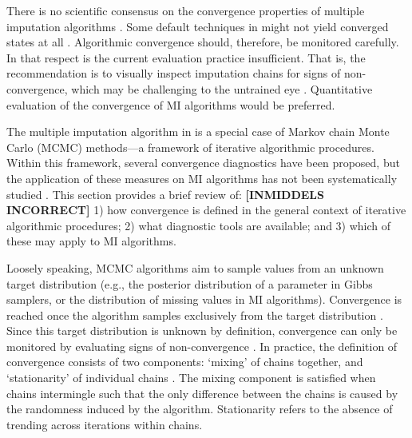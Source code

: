 \documentclass[article]{jss}
\begin{document}
There is no scientific consensus on the convergence properties of multiple imputation algorithms \citep{taka17}. Some default techniques in  might not yield converged states at all \citep{murr18}. Algorithmic convergence should, therefore, be monitored carefully. In that respect is the current evaluation practice insufficient. That is, the  recommendation is to visually inspect imputation chains for signs of non-convergence, which may be challenging to the untrained eye \citep[\S~6.5.2]{buur18}. Quantitative evaluation of the convergence of MI algorithms would be preferred.

The multiple imputation algorithm in  is a special case of Markov chain Monte Carlo (MCMC) methods---a framework of iterative algorithmic procedures. Within this framework, several convergence diagnostics have been proposed, but the application of these measures on MI algorithms has not been systematically studied \citep{buur18}.
This section provides a brief review of: \textbf{[INMIDDELS INCORRECT]}%
1) how convergence is defined in the general context of iterative algorithmic procedures; 2) what diagnostic tools are available; and 3) which of these may apply to MI algorithms. 

Loosely speaking, MCMC algorithms aim to sample values from an unknown target distribution (e.g., the posterior distribution of a parameter in Gibbs samplers, or the distribution of missing values in MI algorithms). Convergence is reached once the algorithm samples exclusively from the target distribution \citep{cowl96}. Since this target distribution is unknown by definition, convergence can only be monitored by evaluating signs of non-convergence \citep{hoff09}. In practice, the definition of convergence consists of two components: `mixing' of chains together, and `stationarity' of individual chains \citep[p.~284]{gelm13}. The mixing component is satisfied when chains intermingle such that the only difference between the chains is caused by the randomness induced by the algorithm. Stationarity refers to the absence of trending across iterations within chains. %
\end{document}
